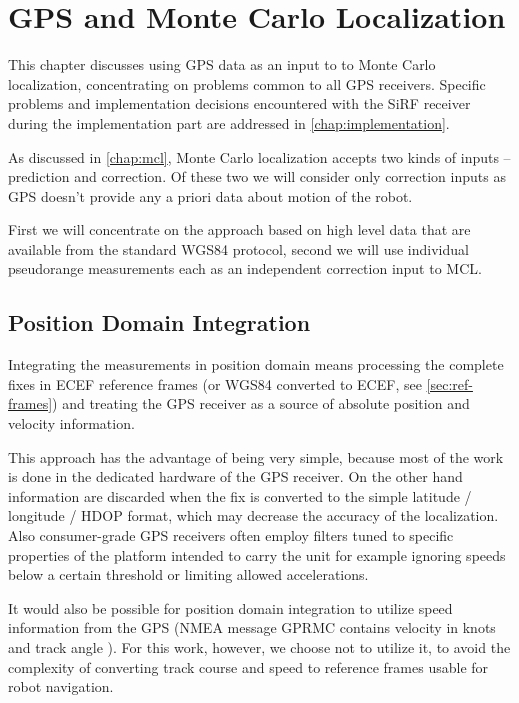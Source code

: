 \chapter{GPS and Monte Carlo Localization}
\label{chap:gps-and-mcl}

This chapter discusses using GPS data as an input to to Monte Carlo localization,
concentrating on problems common to all GPS receivers.
Specific problems and implementation decisions encountered with the SiRF receiver
during the implementation part are addressed in \cref{chap:implementation}.

As discussed in \cref{chap:mcl}, Monte Carlo localization accepts two kinds of
inputs -- prediction and correction.
Of these two we will consider only correction inputs as GPS doesn't provide any
a priori data about motion of the robot.

First we will concentrate on the approach based on high level data that are available
from the standard WGS84 protocol,
second we will use individual pseudorange measurements each as an independent
correction input to MCL.

\section{Position Domain Integration}
\label{sec:position-domain}
Integrating the measurements in position domain means processing the complete
fixes in ECEF reference frames (or WGS84 converted to ECEF, see \cref{sec:ref-frames})
and treating the GPS receiver as a source of absolute position and velocity information.

This approach has the advantage of being very simple, because most of the work
is done in the dedicated hardware of the GPS receiver.
On the other hand information are discarded when the fix is converted to the simple
latitude / longitude / HDOP format, which may decrease the accuracy of the
localization.
Also consumer-grade GPS receivers often employ filters tuned to specific properties
of the platform intended to carry the unit for example ignoring speeds
below a certain threshold or limiting allowed accelerations.

It would also be possible for position domain integration to utilize speed information
from the GPS (NMEA message GPRMC contains velocity in knots and track angle \cite{depriest}).
For this work, however, we choose not to utilize it, to avoid the complexity of converting
track course and speed to reference frames usable for robot navigation.

